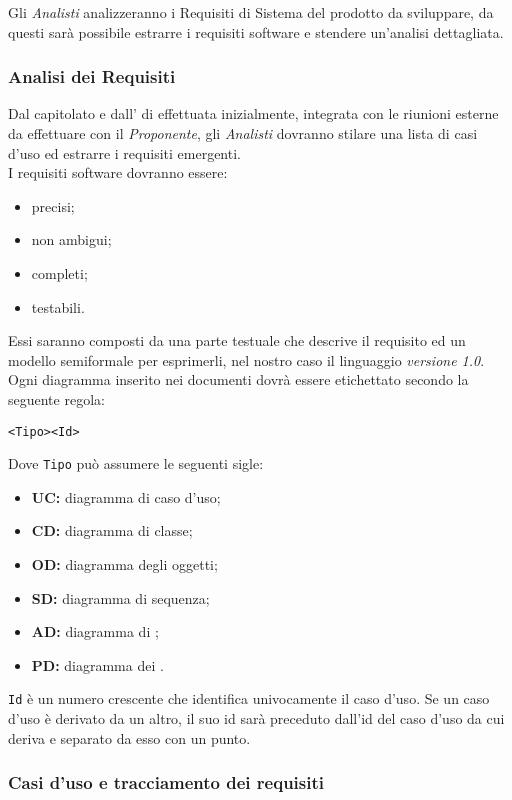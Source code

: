 \documentclass{scalatekids-article}
\begin{document}
Gli \textit{Analisti} analizzeranno i Requisiti di Sistema del prodotto da
sviluppare, da questi sarà possibile estrarre i requisiti software e stendere un'analisi dettagliata.

\subsubsection{Analisi dei Requisiti}

Dal capitolato e dall' di  effettuata
inizialmente, integrata con le riunioni esterne da effettuare con il
\textit{Proponente}, gli \textit{Analisti} dovranno stilare una lista di casi
d'uso ed estrarre i requisiti emergenti.\\
I requisiti software dovranno essere:
\begin{itemize}
\item precisi;
\item non ambigui;
\item completi;
\item testabili.
\end{itemize}
Essi saranno composti da una parte testuale che descrive il requisito ed un
modello semiformale per esprimerli, nel nostro caso il linguaggio 
\textit{versione 1.0}. Ogni diagramma inserito nei documenti dovrà essere
etichettato secondo la seguente regola:
\begin{center}
  \verb=<Tipo><Id>=
\end{center}
Dove \verb=Tipo= può assumere le seguenti sigle:
\begin{itemize}
\item\textbf{UC:} diagramma di caso d'uso;
\item\textbf{CD:} diagramma di classe;
\item\textbf{OD:} diagramma degli oggetti;
\item\textbf{SD:} diagramma di sequenza;
\item\textbf{AD:} diagramma di ;
\item\textbf{PD:} diagramma dei .
\end{itemize}
\verb=Id= è un numero crescente che identifica
univocamente il caso d'uso. Se un caso d'uso è derivato da un altro, il suo id
sarà preceduto dall'id del caso d'uso da cui deriva e separato da esso con un
punto.

\subsubsection{Casi d'uso e tracciamento dei requisiti}
\end{document}
